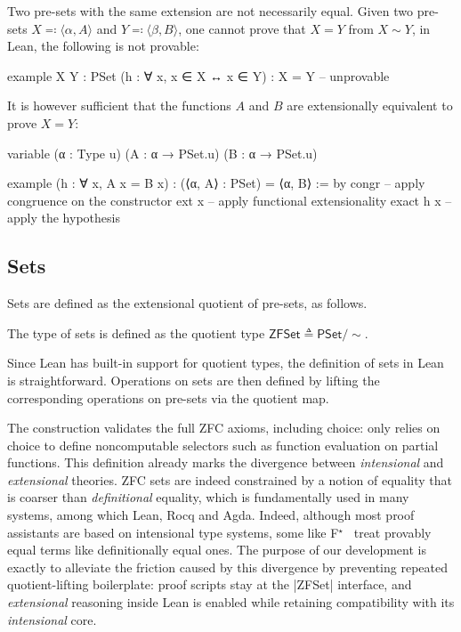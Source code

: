 \begin{example}
  \label{ex:pset-ext}
  Two pre-sets with the same extension are not necessarily equal.
  Given two pre-sets \(X \eqcolon \langle \alpha, A \rangle\) and \(Y \eqcolon \langle \beta, B \rangle\), one cannot prove that \(X = Y\) from \(X \sim Y\), \ie in Lean, the following is not provable:
  \begin{leanlisting}
example {X Y : PSet} (h : ∀ x, x ∈ X ↔ x ∈ Y) : X = Y -- unprovable
  \end{leanlisting}
  It is however sufficient that the functions \(A\) and \(B\) are extensionally equivalent to prove \(X = Y\):
  \begin{leanlisting}
variable (α : Type u) (A : α → PSet.{u}) (B : α → PSet.{u})

example (h : ∀ x, A x = B x) : (⟨α, A⟩ : PSet) = ⟨α, B⟩ := by
  congr      -- apply congruence on the constructor
  ext x      -- apply functional extensionality
  exact h x  -- apply the hypothesis
\end{leanlisting}
\end{example}

\subsection{Sets}
\label{subsec:zflean-sets}

Sets are defined as the extensional quotient of pre-sets, as follows.
\begin{definition}
  The type of sets is defined as the quotient type \(\mathsf{ZFSet} \triangleq \mathsf{PSet}/{\sim}\).
\end{definition}

Since Lean has built-in support for quotient types, the definition of sets in Lean is straightforward.
Operations on sets are then defined by lifting the corresponding operations on pre-sets via the quotient map.

\begin{remark}
  The construction validates the full ZFC axioms, including choice: 
  \zflean only relies on choice to define noncomputable selectors such as function evaluation on partial functions.
  This definition already marks the divergence between \emph{intensional} and \emph{extensional} theories.
  ZFC sets are indeed constrained by a notion of equality that is coarser than \emph{definitional} equality, which is fundamentally used in many systems, among which Lean, Rocq and Agda.
  Indeed, although most proof assistants are based on intensional type systems, some like F\(^\star\)~\cite{fstar} treat provably equal terms like definitionally equal ones.
  The purpose of our development is exactly to alleviate the friction caused by this divergence by preventing repeated quotient-lifting boilerplate: proof scripts stay at the \inlinelean|ZFSet| interface, and \emph{extensional} reasoning inside Lean is enabled while retaining compatibility with its \emph{intensional} core.
\end{remark}

